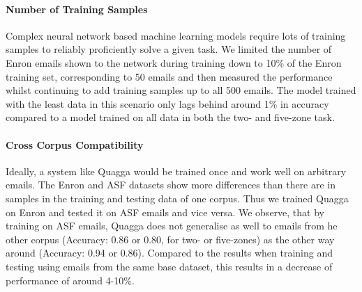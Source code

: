 \documentclass{llncs}
\begin{document}
\paragraph{Number of Training Samples}
Complex neural network based machine learning models require lots of training samples to reliably proficiently solve a given task.
We limited the number of Enron emails shown to the network during training down to 10\% of the Enron training set, corresponding to 50 emails and then measured the performance whilst continuing to add training samples up to all 500 emails.
The model trained with the least data in this scenario only lags behind around 1\% in accuracy compared to a model trained on all data in both the two- and five-zone task.



\paragraph{Cross Corpus Compatibility}
Ideally, a system like Quagga would be trained once and work well on arbitrary emails.
The Enron and ASF datasets show more differences than there are in samples in the training and testing data of one corpus.
Thus we trained Quagga on Enron and tested it on ASF emails and vice versa.
We observe, that by training on ASF emails, Quagga does not generalise as well to emails from he other corpus (Accuracy: 0.86 or 0.80, for two- or five-zones) as the other way around (Accuracy: 0.94 or 0.86).
Compared to the results when training and testing using emails from the same base dataset, this results in a decrease of performance of around 4-10\%.
\end{document}
